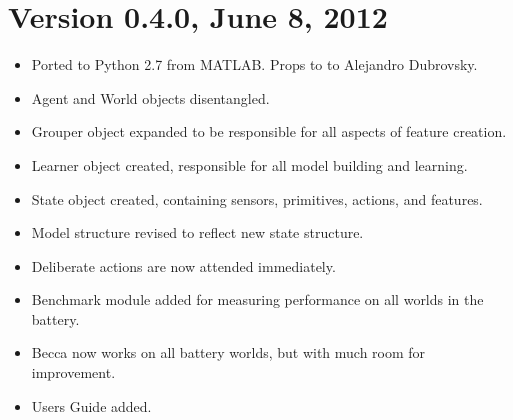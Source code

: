 \section{Version 0.4.0, June 8, 2012}

\begin{itemize}
\item Ported to Python 2.7 from MATLAB. Props to to Alejandro Dubrovsky.
\item Agent and World objects disentangled.
\item Grouper object expanded to be responsible for all aspects of feature creation.
\item Learner object created, responsible for all model building and learning.
\item State object created, containing sensors, primitives, actions, and features.
\item Model structure revised to reflect new state structure.
\item Deliberate actions are now attended immediately.
\item Benchmark module added for measuring performance on all worlds in the battery.
\item Becca now works on all battery worlds, but with much room for improvement.
\item Users Guide added. 
\end{itemize}

